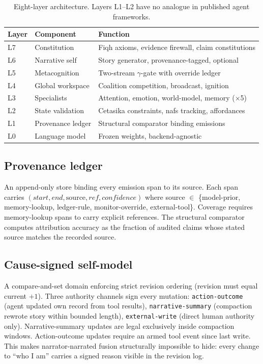 \documentclass[11pt]{article}
\begin{document}
\begin{table}[h]
\centering
\begin{tabular}{llp{8cm}}
\toprule
\textbf{Layer} & \textbf{Component} & \textbf{Function} \\
\midrule
L7 & Constitution & Fiqh axioms, evidence firewall, claim constitutions \\
L6 & Narrative self & Story generator, provenance-tagged, optional \\
L5 & Metacognition & Two-stream $\gamma$-gate with override ledger \\
L4 & Global workspace & Coalition competition, broadcast, ignition \\
L3 & Specialists & Attention, emotion, world-model, memory ($\times$5) \\
L2 & State validation & Cetasika constraints, nafs tracking, affordances \\
L1 & Provenance ledger & Structural comparator binding emissions \\
L0 & Language model & Frozen weights, backend-agnostic \\
\bottomrule
\end{tabular}
\caption{Eight-layer architecture. Layers L1--L2 have no analogue in
published agent frameworks.}
\end{table}

\subsection{Provenance ledger}\label{sec:ledger}

An append-only store binding every emission span to its source. Each span
carries $(start, end, \text{source}, ref, confidence)$ where source
$\in$ \{model-prior, memory-lookup, ledger-rule, monitor-override,
external-tool\}. Coverage requires memory-lookup spans to carry explicit
references. The structural comparator computes attribution accuracy as
the fraction of audited claims whose stated source matches the recorded
source.

\subsection{Cause-signed self-model}\label{sec:selfmodel}

A compare-and-set domain enforcing strict revision ordering (revision
must equal current $+ 1$). Three authority channels sign every mutation:
\texttt{action-\allowbreak{}outcome} (agent updated own record from tool results),
\texttt{narrative-\allowbreak{}summary} (compaction rewrote story within bounded
length), \texttt{external-\allowbreak{}write} (direct human authority only).
Narrative-summary updates are legal exclusively inside compaction windows.
Action-outcome updates require an armed tool event since last write. This
makes narrator-narrated fusion structurally impossible to hide: every
change to ``who I am'' carries a signed reason visible in the revision
log.
\end{document}

